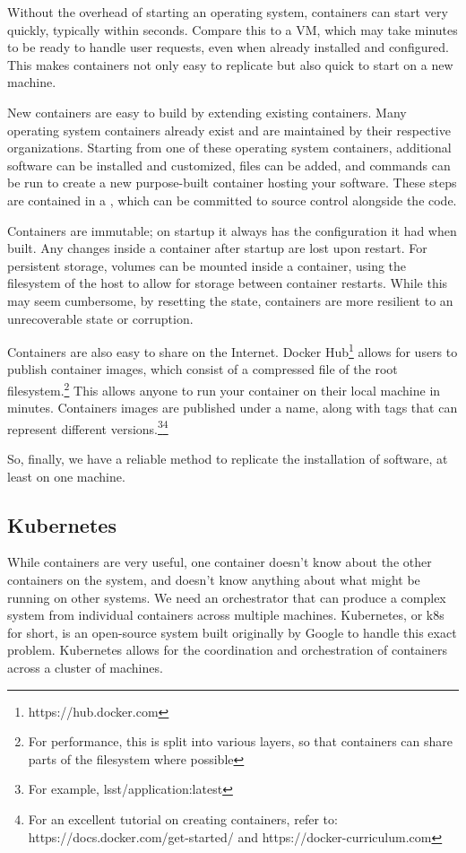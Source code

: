 \documentclass[11pt,twoside]{article}
\begin{document}
Without the overhead of starting an operating system, containers can start very quickly,
typically within seconds.  Compare this to a VM, which may take minutes to be ready to handle
user requests, even when already installed and configured. This makes containers not only
easy to replicate but also quick to start on a new machine.

New containers are easy to build by extending existing containers.  Many operating
system containers already exist and are maintained by their respective organizations.
Starting from one of these operating system containers, additional software can be
installed and customized, files can be added, and commands can be run to create a
new purpose-built container hosting your software.  These steps are contained in a
, which can be committed to source control alongside the code.

Containers are immutable; on startup it always has the configuration it had when built.
Any changes inside a container after startup are lost upon restart.  For persistent storage,
volumes can be mounted inside a container, using the filesystem of the host
to allow for storage between container restarts.  While this may seem cumbersome,
by resetting the state, containers are more resilient to an unrecoverable state or corruption.

Containers are also easy to share on the Internet.  Docker Hub\footnote{https://hub.docker.com}
allows for users to publish container images, which consist of
a compressed  file of the root filesystem.\footnote{For performance, this is split into
various layers, so that containers can share parts of the filesystem where possible} This allows
anyone to run your container on their local machine in minutes.  Containers images are published under
a name, along with tags that can represent different versions.\footnote{For example, lsst/application:latest}\footnote{
For an excellent tutorial on creating containers, refer to: https://docs.docker.com/get-started/
and https://docker-curriculum.com}

So, finally, we have a reliable method to replicate the installation of software,
at least on one machine.

\subsection{Kubernetes}

While containers are very useful, one container doesn't know about the other containers
on the system, and doesn't know anything about what might be running on other systems.
We need an orchestrator that can produce a complex system from individual containers
across multiple machines.  Kubernetes, or k8s for short, is an open-source system
built originally by Google to handle this exact problem.  Kubernetes allows for the
coordination and orchestration of containers across a cluster of machines.
\end{document}
